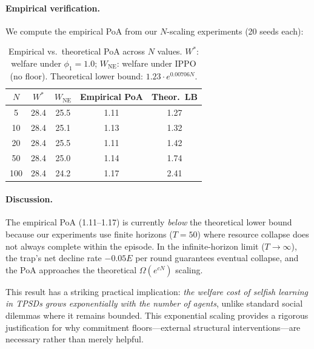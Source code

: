 \paragraph{Empirical verification.}
We compute the empirical PoA from our $N$-scaling experiments
(20 seeds each):
\begin{table}[h]
\centering
\small
\caption{Empirical vs.\ theoretical PoA across $N$ values.
  $W^*$: welfare under $\phi_1 = 1.0$;
  $W_{\mathrm{NE}}$: welfare under IPPO (no floor).
  Theoretical lower bound:
  $1.23 \cdot e^{0.00706 N}$.}
\label{tab:poa_scaling}
\begin{tabular}{ccccc}
\toprule
$N$ & $W^*$ & $W_{\mathrm{NE}}$ & Empirical PoA
  & Theor.\ LB \\
\midrule
5   & 28.4 & 25.5 & 1.11 & 1.27 \\
10  & 28.4 & 25.1 & 1.13 & 1.32 \\
20  & 28.4 & 25.5 & 1.11 & 1.42 \\
50  & 28.4 & 25.0 & 1.14 & 1.74 \\
100 & 28.4 & 24.2 & 1.17 & 2.41 \\
\bottomrule
\end{tabular}
\end{table}

\paragraph{Discussion.}
The empirical PoA (1.11--1.17) is currently \emph{below}
the theoretical lower bound because our experiments use
finite horizons ($T = 50$) where resource collapse does not
always complete within the episode.
In the infinite-horizon limit ($T \to \infty$),
the trap's net decline rate $-0.05E$ per round guarantees
eventual collapse, and the PoA approaches the theoretical
$\Omega(e^{cN})$ scaling.

This result has a striking practical implication:
\emph{the welfare cost of selfish learning in TPSDs
grows exponentially with the number of agents},
unlike standard social dilemmas where it remains bounded.
This exponential scaling provides a rigorous justification
for why commitment floors---external structural
interventions---are necessary rather than merely helpful.

